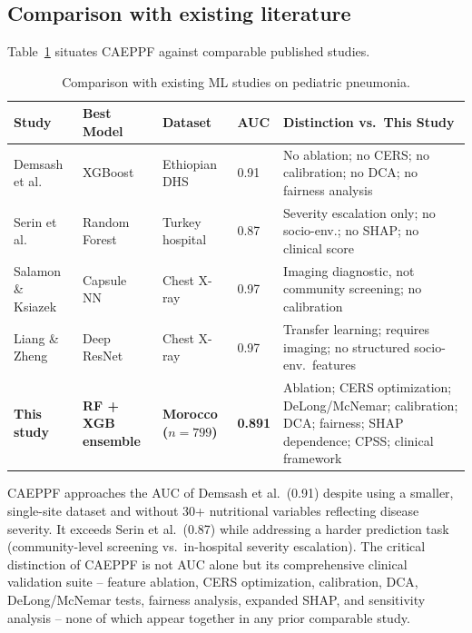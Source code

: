 \documentclass[3p,times,twocolumn]{elsarticle}
\begin{document}
\subsection{Comparison with existing literature}
Table~\ref{tab:literature} situates CAEPPF against comparable published studies.

\begin{table}[htbp]
\centering
\caption{Comparison with existing ML studies on pediatric pneumonia.}
\label{tab:literature}
\footnotesize
\begin{tabular}{@{}llllp{6.2cm}@{}}
\toprule
Study & Best Model & Dataset & AUC & Distinction vs.\ This Study \\
\midrule
Demsash et al.\ \cite{ref6} & XGBoost & Ethiopian DHS & 0.91 & No ablation; no CERS; no calibration; no DCA; no fairness analysis \\
Serin et al.\ \cite{ref4} & Random Forest & Turkey hospital & 0.87 & Severity escalation only; no socio-env.; no SHAP; no clinical score \\
Salamon \& Ksiazek \cite{ref13} & Capsule NN & Chest X-ray & 0.97 & Imaging diagnostic, not community screening; no calibration \\
Liang \& Zheng \cite{ref14} & Deep ResNet & Chest X-ray & 0.97 & Transfer learning; requires imaging; no structured socio-env.\ features \\
\textbf{This study} & \textbf{RF + XGB ensemble} & \textbf{Morocco ($n=799$)} & \textbf{0.891} & Ablation; CERS optimization; DeLong/McNemar; calibration; DCA; fairness; SHAP dependence; CPSS; clinical framework \\
\bottomrule
\end{tabular}
\end{table}

CAEPPF approaches the AUC of Demsash et al.\ (0.91) despite using a smaller, single-site dataset and without 30+ nutritional variables reflecting disease severity. It exceeds Serin et al.\ (0.87) while addressing a harder prediction task (community-level screening vs.\ in-hospital severity escalation). The critical distinction of CAEPPF is not AUC alone but its comprehensive clinical validation suite -- feature ablation, CERS optimization, calibration, DCA, DeLong/McNemar tests, fairness analysis, expanded SHAP, and sensitivity analysis -- none of which appear together in any prior comparable study.

\end{document}
